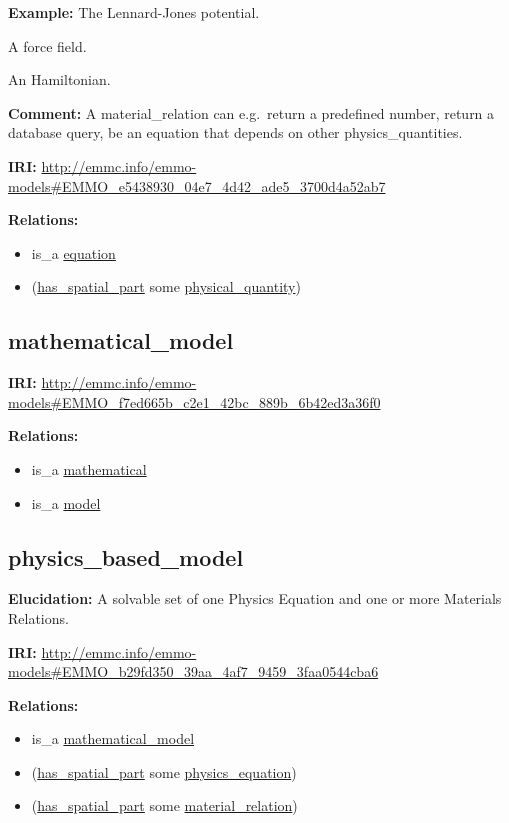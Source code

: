 \documentclass[a4paper,]{report}
\providecommand{\tightlist}{%
  \setlength{\itemsep}{0pt}\setlength{\parskip}{0pt}}
\begin{document}
\textbf{Example:} The Lennard-Jones potential.

A force field.

An Hamiltonian.

\textbf{Comment:} A material\_relation can e.g.~return a predefined
number, return a database query, be an equation that depends on other
physics\_quantities.

\textbf{IRI:}
\url{http://emmc.info/emmo-models\#EMMO_e5438930_04e7_4d42_ade5_3700d4a52ab7}

\textbf{Relations:}

\begin{itemize}
\tightlist
\item
  is\_a \protect\hyperlink{equation}{equation}
\item
  (\protect\hyperlink{has_spatial_part}{has\_spatial\_part} some
  \protect\hyperlink{physical_quantity}{physical\_quantity})
\end{itemize}

\hypertarget{mathematical_model-1}{%
\subsection{mathematical\_model}\label{mathematical_model-1}}

\textbf{IRI:}
\url{http://emmc.info/emmo-models\#EMMO_f7ed665b_c2e1_42bc_889b_6b42ed3a36f0}

\textbf{Relations:}

\begin{itemize}
\tightlist
\item
  is\_a \protect\hyperlink{mathematical}{mathematical}
\item
  is\_a \protect\hyperlink{model}{model}
\end{itemize}

\hypertarget{physics_based_model-1}{%
\subsection{physics\_based\_model}\label{physics_based_model-1}}

\textbf{Elucidation:} A solvable set of one Physics Equation and one or
more Materials Relations.

\textbf{IRI:}
\url{http://emmc.info/emmo-models\#EMMO_b29fd350_39aa_4af7_9459_3faa0544cba6}

\textbf{Relations:}

\begin{itemize}
\tightlist
\item
  is\_a \protect\hyperlink{mathematical_model}{mathematical\_model}
\item
  (\protect\hyperlink{has_spatial_part}{has\_spatial\_part} some
  \protect\hyperlink{physics_equation}{physics\_equation})
\item
  (\protect\hyperlink{has_spatial_part}{has\_spatial\_part} some
  \protect\hyperlink{material_relation}{material\_relation})
\end{itemize}
\end{document}

